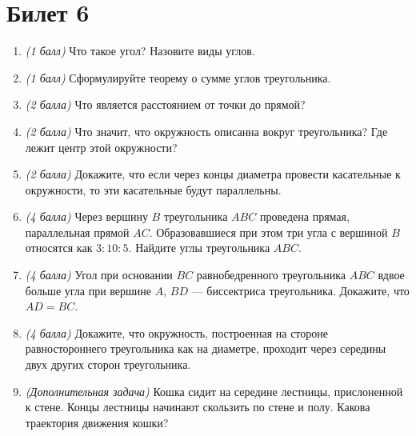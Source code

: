 \documentclass[12pt, a4paper]{article}
\begin{document}
\section*{Билет 6}
\begin{enumerate}
\item \textit{(1 балл)} Что такое угол? Назовите виды углов.
\item \textit{(1 балл)} Сформулируйте теорему о сумме углов треугольника.
\item \textit{(2 балла)} Что является расстоянием от точки до прямой?
\item \textit{(2 балла)} Что значит, что окружность описанна вокруг треугольника? Где лежит центр этой окружности?
\item \textit{(2 балла)} Докажите, что если через концы диаметра провести касательные к окружности, то эти касательные будут параллельны.
\item \textit{(4 балла)} Через вершину $B$ треугольника $ABC$ проведена прямая, параллельная прямой $AC$. Образовавшиеся при этом три угла с вершиной $B$ относятся как $3 : 10 : 5$. Найдите углы треугольника $ABC$.
\item \textit{(4 балла)} Угол при основании $BC$ равнобедренного треугольника $ABC$ вдвое больше угла при вершине $A$, $BD$ — биссектриса треугольника. Докажите, что $AD = BC$.
\item \textit{(4 балла)} Докажите, что окружность, построенная на стороне равностороннего треугольника как на диаметре, проходит через середины двух других сторон треугольника.
\item \textit{(Дополнительная задача)} Кошка сидит на середине лестницы, прислоненной к стене. Концы лестницы начинают скользить по стене и полу. Какова траектория движения кошки?
\end{enumerate}
\end{document}
